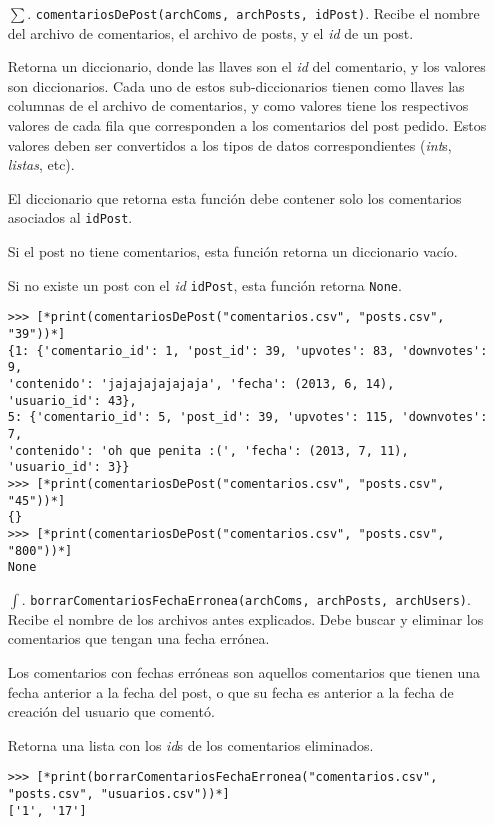 \begin{enumerate}

    \item[$\sum$. ] \texttt{comentariosDePost(archComs, archPosts, idPost)}. Recibe el nombre del archivo de comentarios, el archivo de posts, y el \textit{id} de un post. 

    Retorna un diccionario, donde las llaves son el \textit{id} del comentario, y los valores son diccionarios. Cada uno de estos sub-diccionarios tienen como llaves las columnas de el archivo de comentarios, y como valores tiene los respectivos valores de cada fila que corresponden a los comentarios del post pedido. Estos valores deben ser convertidos a los tipos de datos correspondientes (\textit{int}s, \textit{listas}, etc).

    El diccionario que retorna esta función debe contener solo los comentarios asociados al \texttt{idPost}.

    Si el post no tiene comentarios, esta función retorna un diccionario vacío.
    
    Si no existe un post con el \textit{id} \texttt{idPost}, esta función retorna \texttt{None}.

    \begin{lstlisting}[style=consola]
>>> [*print(comentariosDePost("comentarios.csv", "posts.csv", "39"))*]
{1: {'comentario_id': 1, 'post_id': 39, 'upvotes': 83, 'downvotes': 9, 
'contenido': 'jajajajajajaja', 'fecha': (2013, 6, 14), 'usuario_id': 43}, 
5: {'comentario_id': 5, 'post_id': 39, 'upvotes': 115, 'downvotes': 7, 
'contenido': 'oh que penita :(', 'fecha': (2013, 7, 11), 'usuario_id': 3}}
>>> [*print(comentariosDePost("comentarios.csv", "posts.csv", "45"))*]
{}
>>> [*print(comentariosDePost("comentarios.csv", "posts.csv", "800"))*]
None
    \end{lstlisting}

    \item [$\int$. ] \texttt{borrarComentariosFechaErronea(archComs, archPosts, archUsers)}. Recibe el nombre de los archivos antes explicados. Debe buscar y eliminar los comentarios que tengan una fecha errónea.
    
    Los comentarios con fechas erróneas son aquellos comentarios que tienen una fecha anterior a la fecha del post, o que su fecha es anterior a la fecha de creación del usuario que comentó.

    Retorna una lista con los \textit{id}s de los comentarios eliminados.

    \begin{lstlisting}[style=consola]
>>> [*print(borrarComentariosFechaErronea("comentarios.csv", "posts.csv", "usuarios.csv"))*]
['1', '17']
    \end{lstlisting}

\end{enumerate}

